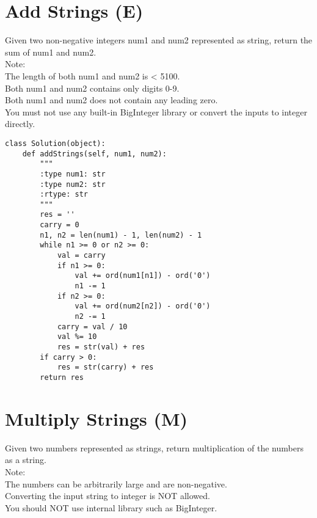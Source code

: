 \section{Add Strings (E)}
Given two non-negative integers num1 and num2 represented as string, return the sum of num1 and num2.\\

Note:\\
    The length of both num1 and num2 is < 5100.\\
    Both num1 and num2 contains only digits 0-9.\\
    Both num1 and num2 does not contain any leading zero.\\
    You must not use any built-in BigInteger library or convert the inputs to integer directly.\\
\begin{lstlisting}
class Solution(object):
    def addStrings(self, num1, num2):
        """
        :type num1: str
        :type num2: str
        :rtype: str
        """
        res = ''
        carry = 0
        n1, n2 = len(num1) - 1, len(num2) - 1
        while n1 >= 0 or n2 >= 0:
            val = carry
            if n1 >= 0: 
                val += ord(num1[n1]) - ord('0')
                n1 -= 1
            if n2 >= 0: 
                val += ord(num2[n2]) - ord('0')
                n2 -= 1
            carry = val / 10
            val %= 10
            res = str(val) + res
        if carry > 0:
            res = str(carry) + res
        return res
\end{lstlisting}

\section{Multiply Strings (M)}
Given two numbers represented as strings, return multiplication of the numbers as a string.\\

Note:\\
    The numbers can be arbitrarily large and are non-negative.\\
    Converting the input string to integer is NOT allowed.\\
    You should NOT use internal library such as BigInteger.\\


